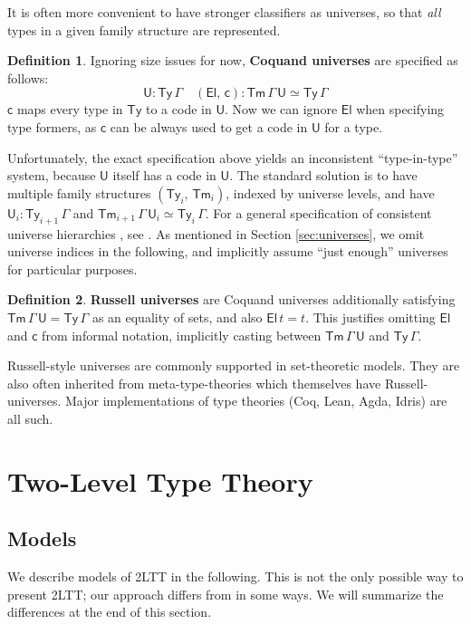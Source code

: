\documentclass[12pt,a4paper,twoside,openany]{book}
\theoremstyle{remark}
\theoremstyle{definition}
\newtheorem{mydefinition}{Definition}
\theoremstyle{theorem}
\newcommand{\ms}[1]{\mathsf{#1}}
\newcommand{\Tm}{\mathsf{Tm}}
\newcommand{\Ty}{\mathsf{Ty}}
\newcommand{\U}{\mathsf{U}}
\newcommand{\El}{\mathsf{El}}
\begin{document}
It is often more convenient to have stronger classifiers as universes, so that
\emph{all} types in a given family structure are represented.

\begin{mydefinition}
Ignoring size issues for now, \textbf{Coquand universes} \cite{TODO} are
specified as follows:
\[
  \U : \Ty\,\Gamma\hspace{1em} (\El,\,\ms{c}) : \Tm\,\Gamma\,\U \simeq \Ty\,\Gamma
\]
$\ms{c}$ maps every type in $\Ty$ to a code in $\U$. Now we can ignore $\El$
when specifying type formers, as $\ms{c}$ can be always used to get a code in
$\U$ for a type.
\end{mydefinition}

Unfortunately, the exact specification above yields an inconsistent
``type-in-type'' system, because $\U$ itself has a code in $\U$. The standard
solution is to have multiple family structures $(\Ty_i,\,\Tm_i)$, indexed by
universe levels, and have $\U_i : \Ty_{i + 1}\,\Gamma$ and
$\Tm_{i+1}\,\Gamma\,\U_i \simeq \Ty_i\,\Gamma$. For a general specification of
consistent universe hierarchies , see \cite{kovacs2021generalized}. As mentioned in Section
\ref{sec:universes}, we omit universe indices in the following, and implicitly
assume ``just enough'' universes for particular purposes.

\begin{mydefinition}
\textbf{Russell universes} are Coquand universes additionally satisfying
$\Tm\,\Gamma\,\U = \Ty\,\Gamma$ as an equality of sets, and also $\ms{El}\,t =
t$. This justifies omitting $\El$ and $\ms{c}$ from informal notation,
implicitly casting between $\Tm\,\Gamma\,\U$ and $\Ty\,\Gamma$.
\end{mydefinition}
Russell-style universes are commonly supported in set-theoretic models. They are
also often inherited from meta-type-theories which themselves have
Russell-universes. Major implementations of type theories (Coq, Lean, Agda,
Idris) are all such.


\section{Two-Level Type Theory}

\subsection{Models}

We describe models of 2LTT in the following. This is not the only possible way
to present 2LTT; our approach differs from \cite{twolevel} in some ways. We will summarize
the differences at the end of this section.
\end{document}
